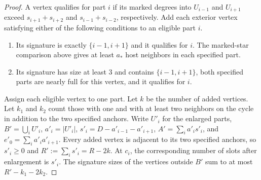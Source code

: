 \begin{proof}
A vertex qualifies for part $i$ if its marked degrees into
$U_{i-1}$ and $U_{i+1}$ exceed $s_{i+1}+s_{i+2}$ and
$s_{i-1}+s_{i-2}$, respectively. Add each exterior vertex satisfying
either of the following conditions to an eligible part $i$.
\begin{enumerate}[label=(\roman*)]
\item Its signature is exactly $\{i-1,i+1\}$ and it qualifies for $i$.
      The marked-star comparison above gives at least $a_*$ host
      neighbors in each specified part.
\item Its signature has size at least $3$ and contains $\{i-1,i+1\}$,
      both specified parts are nearly full for this vertex,
      and it qualifies for $i$.
\end{enumerate}
Assign each eligible vertex to one part. Let $k$ be the number of
added vertices. Let $k_1$ and $k_2$ count those with one and with at least
two neighbors on the cycle in addition to the two specified anchors.
Write $U'_i$ for the enlarged parts, $B'=\bigcup_i U'_i$,
$a'_i=|U'_i|$, $s'_i=D-a'_{i-1}-a'_{i+1}$, $A'=\sum_i a'_is'_i$,
and $e'_0=\sum_i a'_ia'_{i+1}$. Every added vertex is adjacent to its two
specified anchors, so $s'_i\geq0$ and $R':=\sum_i s'_i=R-2k$.
At $c_i$, the corresponding number of slots after enlargement is $s'_i$.
The signature sizes of the vertices outside $B'$ sum to at most
$R'-k_1-2k_2$.


\end{proof}
